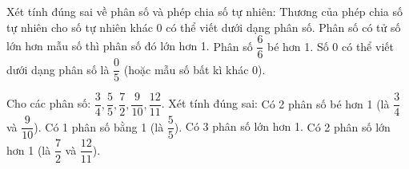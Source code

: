 \begin{ex} %
Xét tính đúng sai về phân số và phép chia số tự nhiên:
\choiceTF
{\True Thương của phép chia số tự nhiên cho số tự nhiên khác 0 có thể viết dưới dạng phân số.}
{\True Phân số có tử số lớn hơn mẫu số thì phân số đó lớn hơn 1.}
{Phân số $\dfrac{6}{6}$ bé hơn 1.}
{\True Số 0 có thể viết dưới dạng phân số là $\dfrac{0}{5}$ (hoặc mẫu số bất kì khác 0).}
\end{ex}

\begin{ex} %
Cho các phân số: $\dfrac{3}{4}, \dfrac{5}{5}, \dfrac{7}{2}, \dfrac{9}{10}, \dfrac{12}{11}$. Xét tính đúng sai:
\choiceTF
{\True Có 2 phân số bé hơn 1 (là $\dfrac{3}{4}$ và $\dfrac{9}{10}$).}
{\True Có 1 phân số bằng 1 (là $\dfrac{5}{5}$).}
{Có 3 phân số lớn hơn 1.}
{\True Có 2 phân số lớn hơn 1 (là $\dfrac{7}{2}$ và $\dfrac{12}{11}$).}
\end{ex}

